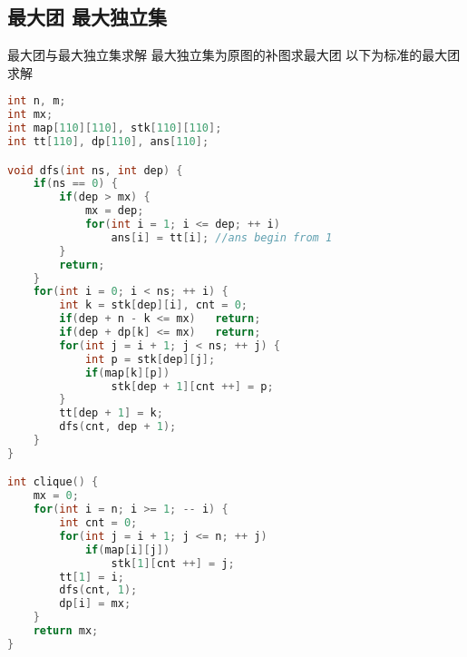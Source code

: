 \subsection{最大团 最大独立集}
最大团与最大独立集求解
最大独立集为原图的补图求最大团
以下为标准的最大团求解
    \begin{lstlisting}[language=c++]
int n, m;
int mx;
int map[110][110], stk[110][110];
int tt[110], dp[110], ans[110];

void dfs(int ns, int dep) {
    if(ns == 0) {
        if(dep > mx) {
            mx = dep;
            for(int i = 1; i <= dep; ++ i)
                ans[i] = tt[i]; //ans begin from 1
        }
        return;
    }
    for(int i = 0; i < ns; ++ i) {
        int k = stk[dep][i], cnt = 0;
        if(dep + n - k <= mx)   return;
        if(dep + dp[k] <= mx)   return;
        for(int j = i + 1; j < ns; ++ j) {
            int p = stk[dep][j];
            if(map[k][p])
                stk[dep + 1][cnt ++] = p;
        }
        tt[dep + 1] = k;
        dfs(cnt, dep + 1);
    }
}

int clique() {
    mx = 0;
    for(int i = n; i >= 1; -- i) {
        int cnt = 0;
        for(int j = i + 1; j <= n; ++ j)
            if(map[i][j])
                stk[1][cnt ++] = j;
        tt[1] = i;
        dfs(cnt, 1);
        dp[i] = mx;
    }
    return mx;
}
    \end{lstlisting}
